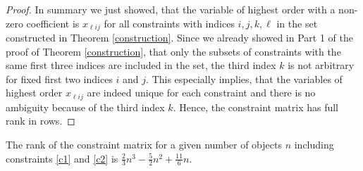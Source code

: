 \begin{proof}
	In summary we just showed, that the variable of highest order with a non-zero coefficient is $x_{\ell ij}$ for all constraints with indices $i,j,k,\ell$ in the set constructed in Theorem \ref{construction}. Since we already showed in Part 1 of the proof of Theorem \ref{construction}, that only the subsets of constraints with the same first three indices are included in the set, the third index $k$ is not arbitrary for fixed first two indices $i$ and $j$. This especially implies, that the variables of highest order $x_{\ell ij}$ are indeed unique for each constraint and there is no ambiguity because of the third index $k$. Hence, the constraint matrix has full rank in rows.
\end{proof}
\newpage
\begin{corollary}\label{rank}
	The rank of the constraint matrix for a given number of objects $n$ including constraints \ref{c1} and \ref{c2} is $\frac{2}{3}n^3-\frac{5}{2}n^2+\frac{11}{6}n$.
\end{corollary}

